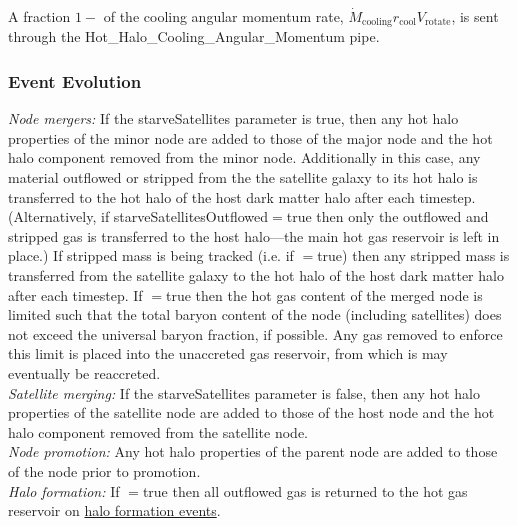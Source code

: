 A fraction $1-${\normalfont \ttfamily [hotHaloAngularMomentumLossFraction]} of the cooling angular momentum rate, $\dot{M}_\mathrm{cooling} r_\mathrm{cool} V_\mathrm{rotate}$, is sent through the {\normalfont \ttfamily Hot\_Halo\_Cooling\_Angular\_Momentum} pipe.

\subsubsection{Event Evolution}

\noindent\emph{Node mergers:} If the {\normalfont \ttfamily starveSatellites} parameter is true, then any hot halo properties of the minor \gls{node} are added to those of the major \gls{node} and the hot halo \gls{component} removed from the minor node. Additionally in this case, any material outflowed or stripped from the the satellite galaxy to its hot halo is transferred to the hot halo of the host dark matter halo after each timestep. (Alternatively, if {\normalfont \ttfamily starveSatellitesOutflowed}$=${\normalfont \ttfamily true} then only the outflowed and stripped gas is transferred to the host halo---the main hot gas reservoir is left in place.) If stripped mass is being tracked (i.e. if {\normalfont \ttfamily [hotHaloTrackStrippedGas]}$=${\normalfont \ttfamily true}) then any stripped mass is transferred from the satellite galaxy to the hot halo of the host dark matter halo after each timestep. If {\normalfont \ttfamily [hotHaloNodeMergerLimitBaryonFraction]}$=${\normalfont \ttfamily true} then the hot gas content of the merged node is limited such that the total baryon content of the node (including satellites) does not exceed the universal baryon fraction, if possible. Any gas removed to enforce this limit is placed into the unaccreted gas reservoir, from which is may eventually be reaccreted.\\

\noindent\emph{Satellite merging:} If the {\normalfont \ttfamily starveSatellites} parameter is false, then any hot halo properties of the satellite \gls{node} are added to those of the host \gls{node} and the hot halo \gls{component} removed from the satellite node.\\

\noindent\emph{Node promotion:} Any hot halo properties of the parent \gls{node} are added to those of the \gls{node} prior to promotion.\\

\noindent\emph{Halo formation:} If {\normalfont \ttfamily [hotHaloOutflowReturnOnFormation]}$=${\normalfont \ttfamily true} then all outflowed gas is returned to the hot gas reservoir on \href{https://github.com/galacticusorg/galacticus/releases/download/bleeding-edge/Galacticus_Development.pdf\#sec.HaloFormationEvents}{halo formation events}.\\

